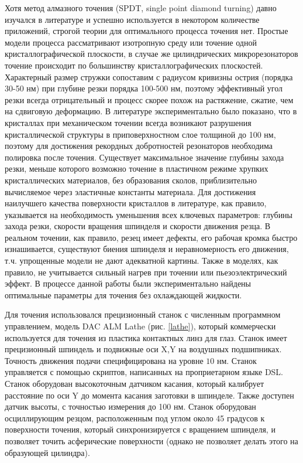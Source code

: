 Хотя метод алмазного точения (SPDT, single point diamond turning) давно изучался в литературе и успешно используется в некотором количестве приложений, строгой теории для оптимального процесса точения нет. Простые модели процесса рассматривают изотропную среду или точение одной кристаллографической плоскости, в случае же цилиндрических микрорезонаторов точение происходит по большинству кристаллографических плоскостей. Характерный размер стружки сопоставим с радиусом кривизны острия (порядка 30-50 нм) при глубине резки порядка 100-500 нм, поэтому эффективный угол резки всегда отрицательный и процесс скорее похож на растяжение, сжатие, чем на сдвиговую деформацию. В литературе экспериментально было показано, что в кристаллах при механическом точении всегда возникают разрушения кристаллической структуры в приповерхностном слое толщиной до 100 нм, поэтому для достижения рекордных добротностей резонаторов необходима полировка после точения. Существует максимальное значение глубины захода резки, меньше которого возможно точение в пластичном режиме хрупких кристаллических материалов, без образования сколов, приблизительно вычисляемое через эластичные константы материала. Для достижения наилучшего качества поверхности кристаллов в литературе, как правило, указывается на необходимость уменьшения всех ключевых параметров: глубины захода резки, скорости вращения шпинделя и скорости движения резца. В реальном точении, как правило, резец имеет дефекты, его рабочая кромка быстро изнашивается, существуют биения шпинделя и неравномерность его движения, т.ч. упрощенные модели не дают адекватной картины. Также в моделях, как правило, не учитывается сильный нагрев при точении или пьезоэлектрический эффект. В процессе данной работы были экспериментально найдены оптимальные параметры для точения без охлаждающей жидкости.

Для точения использовался прецизионный станок с численным программном управлением, модель DAC ALM Lathe (рис. \ref{lathe}), который коммерчески используется для точения из пластика контактных линз для глаз. Станок имеет прецизионный шпиндель и подвижные оси X,Y на воздушных подшипниках. Точность движения подачи специфицирована на уровне $10$ нм. Станок управляется с помощью скриптов, написанных на проприетарном языке DSL. Станок оборудован высокоточным датчиком касания, который калибрует расстояние по оси Y до момента касания заготовки в шпинделе. Также доступен датчик высоты, с точностью измерения до 100 нм. Станок оборудован осциллирующим резцом, расположенным под углом около 45 градусов к поверхности точения, который синхронизируется с вращением шпинделя, и позволяет точить асферические поверхности (однако не позволяет делать этого на образующей цилиндра).


